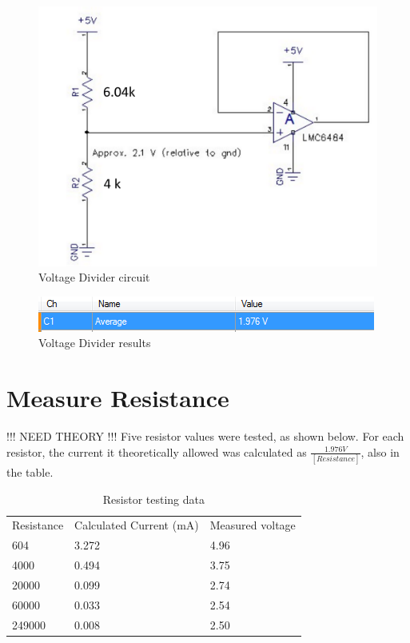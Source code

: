 \documentclass[11pt]{article} %
\begin{document}
\begin{figure}[H]
	\centering
	\includegraphics[width=.7\textwidth]{CD1.PNG}
	\caption{Voltage Divider circuit}
\end{figure}

\begin{figure}[H]
	\centering
	\includegraphics[width=.7\textwidth]{VoltageDivider.png}
	\caption{Voltage Divider results}
 	\label{fig:awesome}
\end{figure}

\section{Measure Resistance}
 !!! NEED THEORY !!!
Five resistor values were tested, as shown below. For each resistor, the current it theoretically allowed was calculated as $\frac {1.976V} {[Resistance]}$, also in the table.
\begin{table}[H]
\centering
\caption{Resistor testing data}
\begin{tabular}{lll}
Resistance & Calculated Current (mA) & Measured voltage \\
604        & 3.272                   & 4.96             \\
4000       & 0.494                   & 3.75             \\
20000      & 0.099                   & 2.74             \\
60000      & 0.033                   & 2.54             \\
249000     & 0.008                   & 2.50            
\end{tabular}
\end{table}
\end{document}
